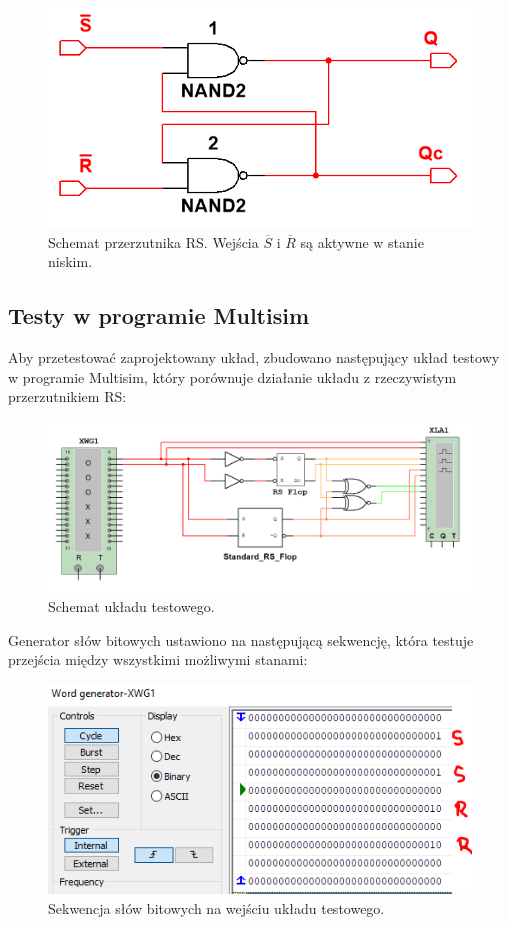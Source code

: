 \documentclass[12pt,a4paper,table]{article}
\begin{document}
    \begin{figure}[h!]
        \centering
        \includegraphics[width=0.5\linewidth]{images/rs_schematic.PNG}
        \caption{Schemat przerzutnika RS. Wejścia $\overline{S}$ i $\overline{R}$ są aktywne w stanie niskim.}
        \label{fig:rs_schematic}
    \end{figure}

    \subsection{Testy w programie Multisim}

    Aby przetestować zaprojektowany układ, zbudowano następujący układ testowy w programie Multisim, 
    który porównuje działanie układu z rzeczywistym przerzutnikiem RS:

    \begin{figure}[h]
        \centering
        \includegraphics[width=0.9\linewidth]{images/rs_test.PNG}
        \caption{Schemat układu testowego.}
        \label{fig:rs_test}
    \end{figure}

    Generator słów bitowych ustawiono na następującą sekwencję, która testuje przejścia między wszystkimi
    możliwymi stanami:

    \begin{figure}[h]
        \centering
        \includegraphics[width=0.6\linewidth]{images/rs_xwg.PNG}
        \caption{Sekwencja słów bitowych na wejściu układu testowego.}
        \label{fig:rs_xwg}
    \end{figure}
\end{document}
